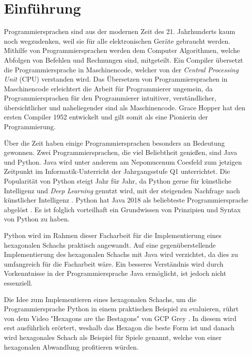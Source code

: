 \setcounter{page}{3}
\chapter{Einführung} %
Programmiersprachen sind aus der modernen Zeit des 21. Jahrhunderts kaum noch wegzudenken, weil sie für alle elektronischen Geräte gebraucht werden. Mithilfe von Programmiersprachen werden dem Computer Algorithmen, welche Abfolgen von Befehlen und Rechnungen sind, mitgeteilt. Ein Compiler übersetzt die Programmiersprache in Maschinencode, welcher von der \textit{Central Processing Unit} (CPU) verstanden wird. Das Übersetzen von Programmiersprachen in Maschinencode erleichtert die Arbeit für Programmierer ungemein, da Programmiersprachen für den Programmierer intuitiver, verständlicher, übersichtlicher und naheliegender sind als Maschinencode. Grace Hopper hat den ersten Compiler 1952 entwickelt und gilt somit als eine Pionierin der Programmierung.
\cite{Louis:2010}

\par %
Über die Zeit haben einige Programmiersprachen besonders an Bedeutung gewonnen. 
Zwei Programmiersprachen, die viel Beliebtheit genießen, sind Java und Python. 
Java wird unter anderem am Nepomucenum Coesfeld zum jetzigen Zeitpunkt im Informatik-Unterricht der Jahrgangsstufe Q1 unterrichtet. 
Die Popularität von Python steigt Jahr für Jahr, da Python gerne für künstliche Intelligenz und \textit{Deep Learning} genutzt wird, mit der steigenden Nachfrage nach künstlicher Intelligenz \cite{Github:PYPL}\cite{Gray:2017}. 
Python hat Java 2018 als beliebteste Programmiersprache abgelöst \cite{Github:PYPL}. 
Es ist folglich vorteilhaft ein Grundwissen von Prinzipien und Syntax von Python zu haben. 

\par %
Python wird im Rahmen dieser Facharbeit für die Implementierung eines hexagonalen Schachs praktisch angewandt. 
Auf eine gegenüberstellende Implementierung des hexagonalen Schachs mit Java wird verzichtet, da dies zu umfangreich für die Facharbeit wäre. 
Ein besseres Verständnis wird durch Vorkenntnisse in der Programmiersprache Java ermöglicht, ist jedoch nicht essenziell. 

\par %
Die Idee zum Implementieren eines hexagonalen Schachs, um die Programmiersprache Python in einem praktischen Beispiel zu evaluieren, rührt von dem Video "Hexagons are the Bestagons" von GCP Grey \cite{Grey:Bestagons}. 
In diesem wird erst ausführlich erörtert, weshalb das Hexagon die beste Form ist und danach wird hexagonales Schach als Beispiel für Spiele genannt, welche von einer hexagonalen Abwandlung profitieren würden.
